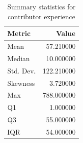 \begin{table}
\caption{Summary statistics for contributor experience}
\label{tab:contributor-experience}
\begin{tabular}{lr}
\toprule
Metric & Value \\
\midrule
Mean & 57.210000 \\
Median & 10.000000 \\
Std. Dev. & 122.210000 \\
Skewness & 3.720000 \\
Max & 788.000000 \\
Q1 & 1.000000 \\
Q3 & 55.000000 \\
IQR & 54.000000 \\
\bottomrule
\end{tabular}
\end{table}

